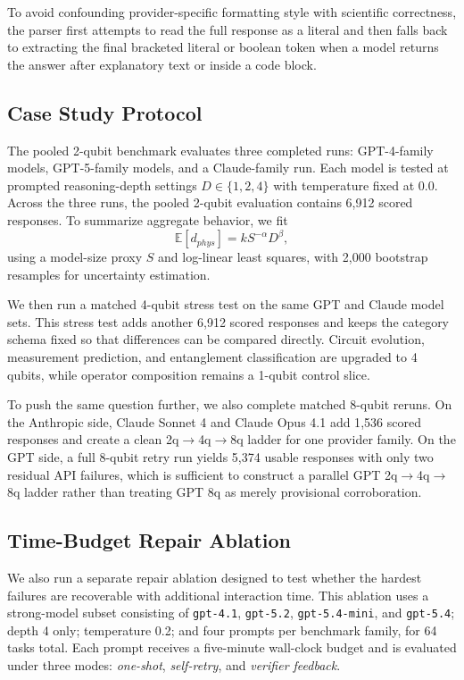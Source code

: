\documentclass[11pt]{article}
\begin{document}
To avoid confounding provider-specific formatting style with scientific correctness, the parser first attempts to read the full response as a literal and then falls back to extracting the final bracketed literal or boolean token when a model returns the answer after explanatory text or inside a code block.

\subsection{Case Study Protocol}
The pooled 2-qubit benchmark evaluates three completed runs: GPT-4-family models, GPT-5-family models, and a Claude-family run. Each model is tested at prompted reasoning-depth settings $D\in\{1,2,4\}$ with temperature fixed at 0.0. Across the three runs, the pooled 2-qubit evaluation contains 6{,}912 scored responses. To summarize aggregate behavior, we fit
\[
\mathbb{E}[d_{phys}] = k S^{-\alpha} D^{\beta},
\]
using a model-size proxy $S$ and log-linear least squares, with 2{,}000 bootstrap resamples for uncertainty estimation.

We then run a matched 4-qubit stress test on the same GPT and Claude model sets. This stress test adds another 6{,}912 scored responses and keeps the category schema fixed so that differences can be compared directly. Circuit evolution, measurement prediction, and entanglement classification are upgraded to 4 qubits, while operator composition remains a 1-qubit control slice.

To push the same question further, we also complete matched 8-qubit reruns. On the Anthropic side, Claude Sonnet 4 and Claude Opus 4.1 add 1{,}536 scored responses and create a clean 2q$\rightarrow$4q$\rightarrow$8q ladder for one provider family. On the GPT side, a full 8-qubit retry run yields 5{,}374 usable responses with only two residual API failures, which is sufficient to construct a parallel GPT 2q$\rightarrow$4q$\rightarrow$8q ladder rather than treating GPT 8q as merely provisional corroboration.

\subsection{Time-Budget Repair Ablation}
We also run a separate repair ablation designed to test whether the hardest failures are recoverable with additional interaction time. This ablation uses a strong-model subset consisting of \texttt{gpt-4.1}, \texttt{gpt-5.2}, \texttt{gpt-5.4-mini}, and \texttt{gpt-5.4}; depth 4 only; temperature 0.2; and four prompts per benchmark family, for 64 tasks total. Each prompt receives a five-minute wall-clock budget and is evaluated under three modes: \emph{one-shot}, \emph{self-retry}, and \emph{verifier feedback}.
\end{document}
